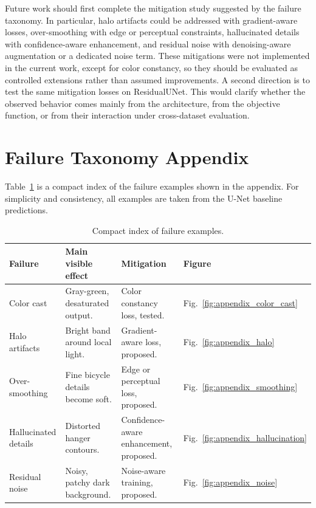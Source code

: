 \documentclass[10pt,twocolumn]{article}
\begin{document}
Future work should first complete the mitigation study suggested by the failure taxonomy. In particular, halo artifacts could be addressed with gradient-aware losses, over-smoothing with edge or perceptual constraints, hallucinated details with confidence-aware enhancement, and residual noise with denoising-aware augmentation or a dedicated noise term. These mitigations were not implemented in the current work, except for color constancy, so they should be evaluated as controlled extensions rather than assumed improvements. A second direction is to test the same mitigation losses on ResidualUNet. This would clarify whether the observed behavior comes mainly from the architecture, from the objective function, or from their interaction under cross-dataset evaluation.

\FloatBarrier

\appendix
\section{Failure Taxonomy Appendix}\label{app:appendix}

Table~\ref{tab:failure_taxonomy_appendix} is a compact index of the failure examples shown in the appendix. For simplicity and consistency, all examples are taken from the U-Net baseline predictions.

\begin{table}[!htbp]
\centering
\caption{Compact index of failure examples.}
\label{tab:failure_taxonomy_appendix}
\small
\footnotesize
\setlength{\tabcolsep}{3pt}
\begin{tabularx}{\columnwidth}{p{}X X p{}}
\toprule
Failure & Main visible effect & Mitigation & Figure \\
\midrule
Color cast & Gray-green, desaturated output. & Color constancy loss, tested. & Fig.~\ref{fig:appendix_color_cast} \\
Halo artifacts & Bright band around local light. & Gradient-aware loss, proposed. & Fig.~\ref{fig:appendix_halo} \\
Over-smoothing & Fine bicycle details become soft. & Edge or perceptual loss, proposed. & Fig.~\ref{fig:appendix_smoothing} \\
Hallucinated details & Distorted hanger contours. & Confidence-aware enhancement, proposed. & Fig.~\ref{fig:appendix_hallucination} \\
Residual noise & Noisy, patchy dark background. & Noise-aware training, proposed. & Fig.~\ref{fig:appendix_noise} \\
\bottomrule
\end{tabularx}
\end{table}
\end{document}
